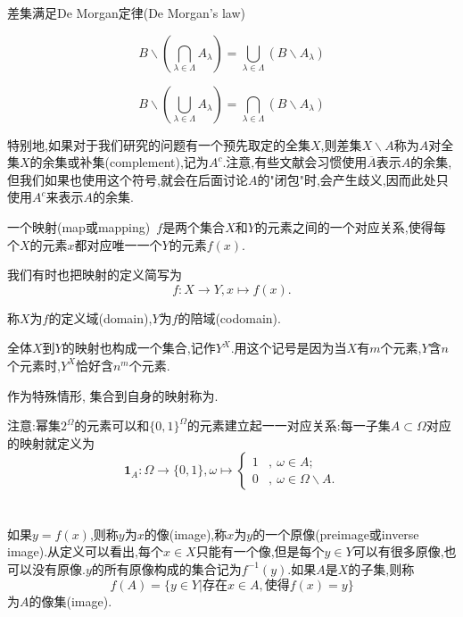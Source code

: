 差集满足De Morgan定律(De Morgan's law)
\begin{blist}
	\item \begin{equation}
	B\backslash\left(\bigcap_{\lambda\in\Lambda}A_{\lambda} \right) = \bigcup_{\lambda\in\Lambda}\left(B\backslash A_\lambda\right)
	\end{equation}
	\item \begin{equation}
	B\backslash\left(\bigcup_{\lambda\in\Lambda}A_{\lambda} \right) = \bigcap_{\lambda\in\Lambda}\left(B\backslash A_\lambda\right)
	\end{equation}
\end{blist}
特别地,如果对于我们研究的问题有一个预先取定的全集$X$,则差集$X\backslash A$称为$A$对全集$X$的余集或补集(complement),记为$A^{c}$.注意,有些文献会习惯使用$\overline{A}$表示$A$的余集,但我们如果也使用这个符号,就会在后面讨论$A$的"闭包"时,会产生歧义,因而此处只使用$A^{c}$来表示$A$的余集.


\begin{definition}[映射]
\begin{blist}
	\item 一个映射(map或mapping)~$f$是两个集合$X$和$Y$的元素之间的一个对应关系,使得每个$X$的元素$x$都对应唯一一个$Y$的元素$f(x)$.
	\item 我们有时也把映射的定义简写为\begin{equation}
	f:X\rightarrow Y,x\mapsto f(x).
	\end{equation}
	\item 称$X$为$f$的定义域(domain),$Y$为$f$的陪域(codomain).
	\item 全体$X$到$Y$的映射也构成一个集合,记作$Y^X$.用这个记号是因为当$X$有$m$个元素,$Y$含$n$个元素时,$Y^X$恰好含$n^m$个元素.
\end{blist}	
\end{definition}

\medskip
\begin{note}
	作为特殊情形, 集合到自身的映射称为.
\end{note}


注意:幂集$2^\Omega$的元素可以和$\{0,1\}^\Omega$的元素建立起一一对应关系:每一子集$A\subset \Omega$对应的映射就定义为\begin{equation}
\bm{1}_A:\Omega\rightarrow \{0,1\},\omega\mapsto\left\{
\begin{aligned}
1 &,~\omega\in A ;\\
0  &,~\omega\in \Omega\backslash A.
\end{aligned}
\right.
\end{equation}
\\ \hspace*{\fill} \\%
如果$y=f(x)$,则称$y$为$x$的像(image),称$x$为$y$的一个原像(preimage或inverse image).从定义可以看出,每个$x\in X$只能有一个像,但是每个$y\in Y$可以有很多原像,也可以没有原像.$y$的所有原像构成的集合记为$f^{-1}(y)$.如果$A$是$X$的子集,则称\begin{equation}
f(A) = \{y\in Y|\text{存在} x\in A,\text{使得}f(x)=y\}
\end{equation}
为$A$的像集(image).



